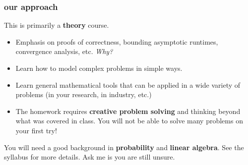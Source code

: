 \documentclass[]{beamer}
\begin{document}
	
	\begin{frame}
		\frametitle{our approach}
		\small
		\begin{center}
			\alert{This is primarily a \textbf{theory} course.}
		\end{center}
		\begin{itemize}
			\item Emphasis on proofs of correctness, bounding asymptotic runtimes, convergence analysis, etc. \textit{Why?}
			\item Learn how to model complex problems in simple ways. 
			\item Learn general mathematical tools that can be applied in a wide variety of problems (in your research, in industry, etc.)
			\item The homework requires \textbf{creative problem solving} and thinking beyond what was covered in class. You will not be able to solve many problems on your first try!
		\end{itemize}
		You will need a good background in \textbf{probability} and \textbf{linear algebra}. See the syllabus for more details. Ask me is you are still unsure.
	\end{frame}
	
	
	
\end{document}
